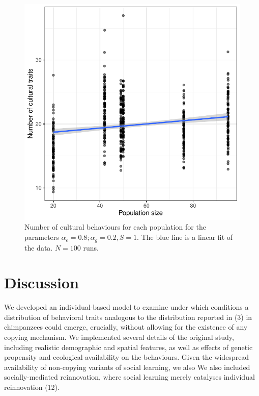 \documentclass[9pt,twocolumn,twoside,]{pnas-new}
\begin{document}
\begin{figure}[h!]
\begin{center}
\includegraphics[width=11.4cm]{figures/figure_5.pdf}
\caption{Number of cultural behaviours for each population for the parameters $\alpha_e=0.8;\alpha_g=0.2,S=1$. The blue line is a linear fit of the data. $N=100$ runs.}
\label{Figure5}
\end{center}
\end{figure}

\section*{Discussion}\label{discussion}

We developed an individual-based model to examine under which conditions
a distribution of behavioral traits analogous to the distribution
reported in (3) in chimpanzees could emerge, crucially, without allowing
for the existence of any copying mechanism. We implemented several
details of the original study, including realistic demographic and
spatial features, as well as effects of genetic propensity and
ecological availability on the behaviours. Given the widespread
availability of non-copying variants of social learning, we also We also
included socially-mediated reinnovation, where social learning merely
catalyses individual reinnovation (12).
\end{document}
